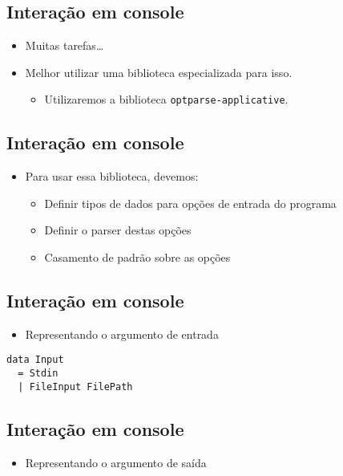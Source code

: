 \documentclass[11pt]{article}
\begin{document}
\subsection*{Interação em console}
\label{sec:orgc2c6ab6}

\begin{itemize}
\item Muitas tarefas\ldots{}

\item Melhor utilizar uma biblioteca especializada para isso.
\begin{itemize}
\item Utilizaremos a biblioteca \texttt{optparse-applicative}.
\end{itemize}
\end{itemize}
\subsection*{Interação em console}
\label{sec:org7ff2bb8}

\begin{itemize}
\item Para usar essa biblioteca, devemos:
\begin{itemize}
\item Definir tipos de dados para opções de entrada do programa
\item Definir o parser destas opções
\item Casamento de padrão sobre as opções
\end{itemize}
\end{itemize}
\subsection*{Interação em console}
\label{sec:orga0683fe}

\begin{itemize}
\item Representando o argumento de entrada
\end{itemize}

\begin{verbatim}
data Input
  = Stdin
  | FileInput FilePath
\end{verbatim}
\subsection*{Interação em console}
\label{sec:org5456343}

\begin{itemize}
\item Representando o argumento de saída
\end{itemize}
\end{document}
